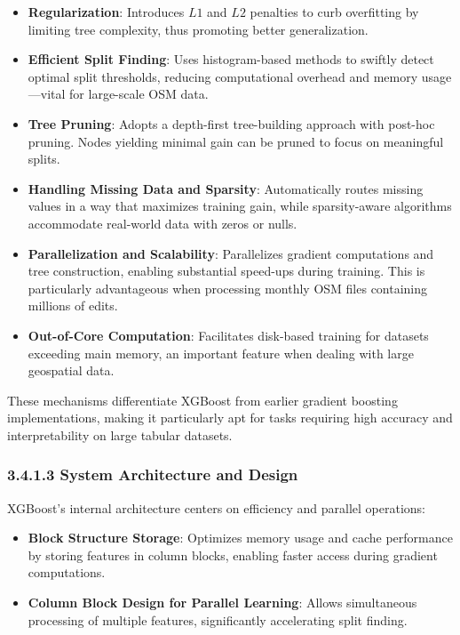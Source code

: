 \documentclass[
    13pt, %
    a4paper, %
    listof=totoc, %
    bibliography=totoc, %
    index=totoc, %
    headsepline
]{scrreprt}
\begin{document}
\begin{itemize}
    \item \textbf{Regularization}:
    Introduces $L1$ and $L2$ penalties to curb overfitting by limiting tree complexity, thus promoting better generalization.

    \item \textbf{Efficient Split Finding}:
    Uses histogram-based methods to swiftly detect optimal split thresholds, reducing computational overhead and memory usage—vital for large-scale OSM data.

    \item \textbf{Tree Pruning}:
    Adopts a depth-first tree-building approach with post-hoc pruning. Nodes yielding minimal gain can be pruned to focus on meaningful splits.

    \item \textbf{Handling Missing Data and Sparsity}:
    Automatically routes missing values in a way that maximizes training gain, while sparsity-aware algorithms accommodate real-world data with zeros or nulls.

    \item \textbf{Parallelization and Scalability}:
    Parallelizes gradient computations and tree construction, enabling substantial speed-ups during training. This is particularly advantageous when processing monthly OSM files containing millions of edits.

    \item \textbf{Out-of-Core Computation}:
    Facilitates disk-based training for datasets exceeding main memory, an important feature when dealing with large geospatial data.
\end{itemize}

\noindent
These mechanisms differentiate XGBoost from earlier gradient boosting implementations, making it particularly apt for tasks requiring high accuracy and interpretability on large tabular datasets.

\subsubsection{3.4.1.3 System Architecture and Design}
\label{sec:xgboost_architecture}

\noindent
XGBoost’s internal architecture centers on efficiency and parallel operations:

\begin{itemize}
    \item \textbf{Block Structure Storage}:
    Optimizes memory usage and cache performance by storing features in column blocks, enabling faster access during gradient computations.

    \item \textbf{Column Block Design for Parallel Learning}:
    Allows simultaneous processing of multiple features, significantly accelerating split finding.

\end{itemize}
\end{document}
